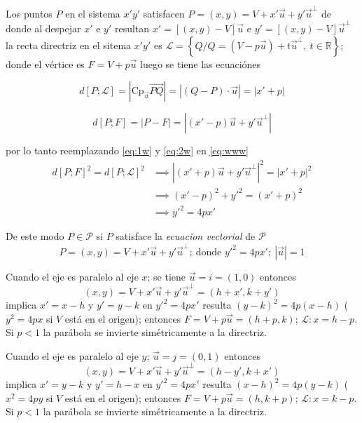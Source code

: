 \documentclass[12pt,]{report}
\theoremstyle{slplain}
\begin{document}
Los puntos \(P\) en el sistema \(x'y'\) satisfacen
\(P=(x,y)=V+x'\vec{u}+y'\vec{u}^\perp\) de donde al despejar \(x'\) e \(y'\) resultan \(x'=[(x,y)-V]\vec{u}\) e \(y'=[(x,y)-V]\vec{u}^\perp\)
la recta directriz en el sitema \(x'y'\) es
\(\mathcal{L}=\left\{Q/Q=(V-p\vec{u})+t\vec{u}^\perp,\:t\in \mathbb{R}\right\}\); donde el vértice es \(F=V+p\vec{u}\) luego se tiene las ecuaciónes

\begin{equation}
d[P;\mathcal{L}]=\left|\text{Cp}_{\vec{u}}\vec{PQ}\right|=\left|(Q-P)\cdot\vec{u}\right|=\left|x'+p\right|\label{eq:1w}
\end{equation}

\begin{equation}
d[P;F]=\left|P-F\right|=\left|(x'-p)\vec{u}+y'\vec{u}^{\perp}\right|\label{eq:2w}
\end{equation}

por lo tanto reemplazando \eqref{eq:1w} y \eqref{eq:2w} en \eqref{eq:www}
\begin{align*}
d\left[P;F\right]^2=d\left[P;\mathcal{L}\right]^2
& \implies \left|(x'+p)\vec{u}+y'\vec{u}^\perp\right|^2=\left|x'+p\right|^2 \\
&\implies (x'-p)^2+y'^2=(x'+p)^2\\
&\implies y'^2=4px'
\end{align*}

De este modo \(P\in\mathcal{P}\) si \(P\) satisface la \emph{ecuacion vectorial} de \(\mathcal{P}\) \[P=(x,y)=V+x'\vec{u}+y'\vec{u}^\perp;\: \text{donde } y'^2=4px'; \:\left|\vec{u}\right|=1\]

Cuando el eje es paralelo al eje \(x\); se tiene \(\vec{u}=i=(1,0)\) entonces \[(x,y)=V+x'\vec{u}+y'\vec{u}^\perp=(h+x',k+y')\] implica \(x'=x-h\) y \(y'=y-k\) en \(y'^2=4px'\) resulta \((y-k)^2=4p(x-h)\) (\(y^2=4px\) si \(V\) está en el origen); entonces \(F=V+p\vec{u}=(h+p,k)\); \(\mathcal{L}: x=h-p\). Si \(p<1\) la parábola se invierte simétricamente a la directriz.

Cuando el eje es paralelo al eje \(y\); \(\vec{u}=j=(0,1)\) entonces \[(x,y)=V+x'\vec{u}+y'\vec{u}^\perp=(h-y',k+x')\] implica \(x'=y-k\) y \(y'=h-x\) en \(y'^2=4px'\) resulta \((x-h)^2=4p(y-k)\) (\(x^2=4py\) si \(V\) está en el origen); entonces \(F=V+p\vec{u}=(h,k+p)\); \(\mathcal{L}: x=k-p\). Si \(p<1\) la parábola se invierte simétricamente a la directriz.
\end{document}
